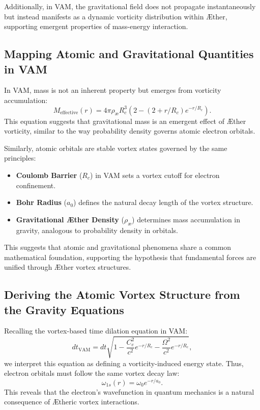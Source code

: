 \documentclass[a4paper,10pt]{article}
\begin{document}
Additionally, in VAM, the gravitational field does not propagate instantaneously but instead manifests as a dynamic vorticity distribution within Æther, supporting emergent properties of mass-energy interaction.


\subsection*{Mapping Atomic and Gravitational Quantities in VAM}


In VAM, mass is not an inherent property but emerges from vorticity accumulation:
\begin{equation*}
M_\text{effective}(r) = 4\pi \rho_\text{\ae} R_c^3 \left( 2 - (2 + r/R_c) e^{-r / R_c} \right).
\end{equation*}
This equation suggests that gravitational mass is an emergent effect of Æther vorticity, similar to the way probability density governs atomic electron orbitals.


Similarly, atomic orbitals are stable vortex states governed by the same principles:
\begin{itemize}
\item \textbf{Coulomb Barrier} ($R_c$) in VAM sets a vortex cutoff for electron confinement.
\item \textbf{Bohr Radius} ($a_0$) defines the natural decay length of the vortex structure.
\item \textbf{Gravitational Æther Density} ($\rho_\text{\ae}$) determines mass accumulation in gravity, analogous to probability density in orbitals.
\end{itemize}
This suggests that atomic and gravitational phenomena share a common mathematical foundation, supporting the hypothesis that fundamental forces are unified through Æther vortex structures.


\subsection*{Deriving the Atomic Vortex Structure from the Gravity Equations}


Recalling the vortex-based time dilation equation in VAM:
\begin{equation*}
dt_\text{VAM} = dt \sqrt{1 - \frac{C_e^2}{c^2} e^{-r/R_c} - \frac{\Omega^2}{c^2} e^{-r/R_c}},
\end{equation*}
we interpret this equation as defining a vorticity-induced energy state. Thus, electron orbitals must follow the same vortex decay law:
\begin{equation*}
\omega_{1s}(r) = \omega_0 e^{-r/a_0}.
\end{equation*}
This reveals that the electron's wavefunction in quantum mechanics is a natural consequence of Ætheric vortex interactions.
\end{document}
